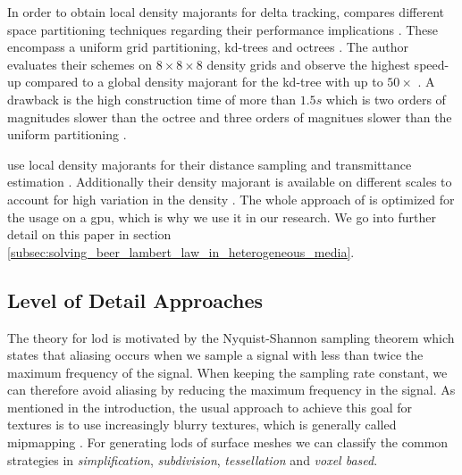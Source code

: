In order to obtain local density majorants for delta tracking, \citeauthor{yue_space_partitioning} compares different space partitioning techniques regarding their performance implications \cite{yue_space_partitioning}.
These encompass a uniform grid partitioning, kd-trees and octrees \citeauthor{yue_space_partitioning}.
The author evaluates their schemes on $8\times8\times8$ density grids and observe the highest speed-up compared to a global density majorant for the kd-tree with up to $50\times$ \cite{yue_space_partitioning}.
A drawback is the high construction time of more than $1.5s$ which is two orders of magnitudes slower than the octree and three orders of magnitues slower than the uniform partitioning \cite{yue_space_partitioning}.

\citeauthor{brick_grid} use local density majorants for their distance sampling and transmittance estimation \cite{brick_grid}.
Additionally their density majorant is available on different scales to account for high variation in the density \cite{brick_grid}.
The whole approach of \citeauthor{brick_grid} is optimized for the usage on a \ac{gpu}, which is why we use it in our research.
We go into further detail on this paper in section \ref{subsec:solving_beer_lambert_law_in_heterogeneous_media}.

\subsection{Level of Detail Approaches}
The theory for \ac{lod} is motivated by the Nyquist-Shannon sampling theorem \cite{shannonsampling} which states that aliasing occurs when we sample a signal with less than twice the maximum frequency of the signal.
When keeping the sampling rate constant, we can therefore avoid aliasing by reducing the maximum frequency in the signal.
As mentioned in the introduction, the usual approach to achieve this goal for textures is to use increasingly blurry textures, which is generally called mipmapping \cite{mipmapping}.
For generating \acsp{lod} of surface meshes we can classify the common strategies in \textit{simplification}, \textit{subdivision}, \textit{tessellation} and \textit{voxel based}.

